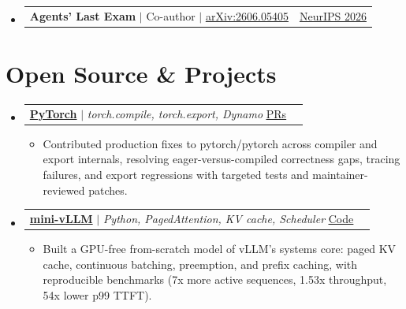 \documentclass[letterpaper,10pt]{article}
\makeatletter
\newcommand{\resumeItem}[1]{
  \item\small{{#1 \vspace{-3pt}}}
}
\newcommand{\resumeProjectHeading}[2]{
  \item
  \begin{tabular*}{0.97\textwidth}{l@{\extracolsep{\fill}}r}
    \small#1 & #2 \\
  \end{tabular*}\vspace{-7pt}
}
\newcommand{\resumeSubHeadingListStart}{
  \begin{itemize}[leftmargin=0.15in, label={}]
}
\newcommand{\resumeSubHeadingListEnd}{
  \end{itemize}
}
\newcommand{\resumeItemListStart}{
  \begin{itemize}[leftmargin=0.2in, topsep=1pt, itemsep=1pt]
}
\newcommand{\resumeItemListEnd}{
  \end{itemize}\vspace{-7pt}
}
\makeatother
\begin{document}
\resumeSubHeadingListStart
  \resumeProjectHeading
    {
      \textbf{Agents' Last Exam} $|$ Co-author $|$
      \href{https://arxiv.org/abs/2606.05405}{\underline{arXiv:2606.05405}}
    }
    {\href{https://neurips.cc/virtual/2026/poster/139517}{\underline{NeurIPS 2026}}}
\resumeSubHeadingListEnd


\section{Open Source \& Projects}

\resumeSubHeadingListStart

  \resumeProjectHeading
    {
      \textbf{
        \href{
          https://github.com/pytorch/pytorch/pulls?q=is\%3Apr+author\%3AWeishuZ
        }{PyTorch}
      }
      $|$
      \emph{torch.compile, torch.export, Dynamo}
      \hfill
      \href{
        https://github.com/pytorch/pytorch/pulls?q=is\%3Apr+author\%3AWeishuZ
      }{\underline{PRs}}
    }
    {}

    \resumeItemListStart

      \resumeItem{
        Contributed production fixes to pytorch/pytorch across
        compiler and export internals, resolving eager-versus-compiled
        correctness gaps, tracing failures, and export regressions with
        targeted tests and maintainer-reviewed patches.
      }

    \resumeItemListEnd

  \resumeProjectHeading
    {
      \textbf{
        \href{https://github.com/WeishuZ/mini-vllm}{mini-vLLM}
      }
      $|$
      \emph{Python, PagedAttention, KV cache, Scheduler}
      \hfill
      \href{https://github.com/WeishuZ/mini-vllm}{\underline{Code}}
    }
    {}

    \resumeItemListStart
      \resumeItem{
        Built a GPU-free from-scratch model of vLLM's systems core:
        paged KV cache, continuous batching, preemption, and prefix
        caching, with reproducible benchmarks (7x more active sequences,
        1.53x throughput, 54x lower p99 TTFT).
      }
    \resumeItemListEnd

\resumeSubHeadingListEnd
\end{document}
